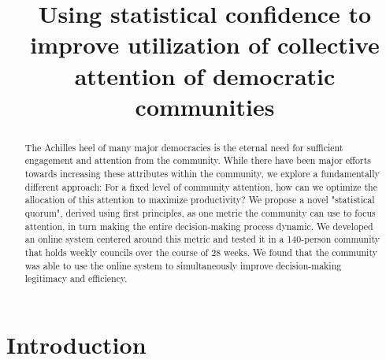 \documentclass{sigchi}
\def\plaintitle{Using statistical confidence to improve utilization of collective attention of democratic communities}
\begin{document}
\title{\plaintitle}


\maketitle

\begin{abstract}
The Achilles heel of many major democracies is the eternal need for sufficient engagement and attention from the community.  While there have been major efforts towards increasing these attributes within the community, we explore a fundamentally different approach: For a fixed level of community attention, how can we optimize the allocation of this attention to maximize productivity?  We propose a novel "statistical quorum", derived using first principles, as one metric the community can use to focus attention, in turn making the entire decision-making process dynamic.  We developed an online system centered around this metric and tested it in a 140-person community that holds weekly councils over the course of 28 weeks.  We found that the community was able to use the online system to simultaneously improve decision-making legitimacy and efficiency.
\end{abstract}

%

\section{Introduction}
\end{document}
